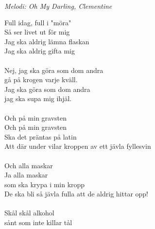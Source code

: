 {\footnotesize\textit{Melodi: Oh My Darling, Clementine}}\par
\vspace{10pt}
Full idag, full i "möra"\\
Så ser livet ut för mig\\
Jag ska aldrig lämna flaskan \\
Jag ska aldrig gifta mig\\
\\
Nej, jag ska göra som dom andra\\
gå på krogen varje kväll.\\
Jag ska göra som dom andra\\
jag ska supa mig ihjäl.\\
\\
Och på min gravsten\\
Och på min gravsten\\
Ska det präntas på latin\\
Att där under vilar kroppen av ett jävla fyllesvin\\
\\
Och alla maskar\\
Ja alla maskar \\
som ska krypa i min kropp\\
De ska bli så jävla fulla att de aldrig hittar opp!\\
\\
Skål skål alkohol\\
sånt som inte killar tål
